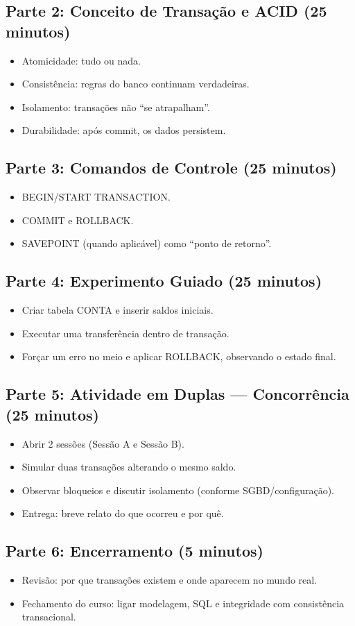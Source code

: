 \documentclass[12pt,a4paper]{article}
\begin{document}
\subsection*{Parte 2: Conceito de Transação e ACID (25 minutos)}
\begin{itemize}[leftmargin=*,itemsep=0.35em]
  \item Atomicidade: tudo ou nada.
  \item Consistência: regras do banco continuam verdadeiras.
  \item Isolamento: transações não ``se atrapalham''.
  \item Durabilidade: após commit, os dados persistem.
\end{itemize}

\subsection*{Parte 3: Comandos de Controle (25 minutos)}
\begin{itemize}[leftmargin=*,itemsep=0.35em]
  \item BEGIN/START TRANSACTION.
  \item COMMIT e ROLLBACK.
  \item SAVEPOINT (quando aplicável) como ``ponto de retorno''.
\end{itemize}

\subsection*{Parte 4: Experimento Guiado (25 minutos)}
\begin{itemize}[leftmargin=*,itemsep=0.35em]
  \item Criar tabela CONTA e inserir saldos iniciais.
  \item Executar uma transferência dentro de transação.
  \item Forçar um erro no meio e aplicar ROLLBACK, observando o estado final.
\end{itemize}

\subsection*{Parte 5: Atividade em Duplas --- Concorrência (25 minutos)}
\begin{itemize}[leftmargin=*,itemsep=0.35em]
  \item Abrir 2 sessões (Sessão A e Sessão B).
  \item Simular duas transações alterando o mesmo saldo.
  \item Observar bloqueios e discutir isolamento (conforme SGBD/configuração).
  \item Entrega: breve relato do que ocorreu e por quê.
\end{itemize}

\subsection*{Parte 6: Encerramento (5 minutos)}
\begin{itemize}[leftmargin=*,itemsep=0.35em]
  \item Revisão: por que transações existem e onde aparecem no mundo real.
  \item Fechamento do curso: ligar modelagem, SQL e integridade com consistência transacional.
\end{itemize}
\end{document}
